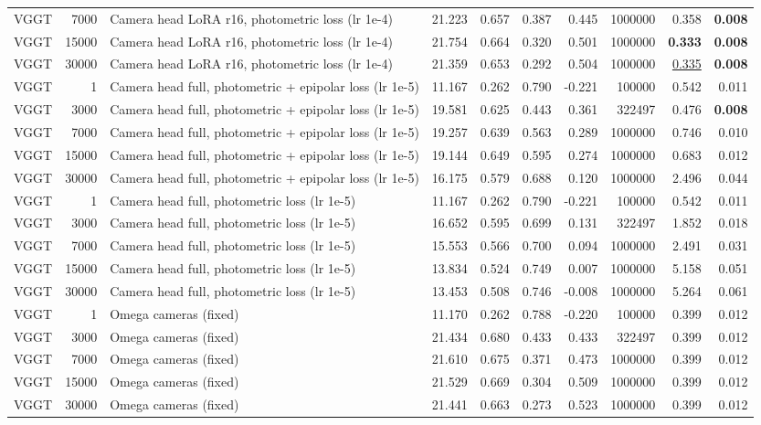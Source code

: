 \begin{table}[H]
\begin{tabular}{lrlrrrrrrr}
VGGT & 7000 & Camera head LoRA r16, photometric loss (lr 1e-4) & 21.223 & 0.657 & 0.387 & 0.445 & 1000000 & 0.358 & \textbf{0.008} \\
VGGT & 15000 & Camera head LoRA r16, photometric loss (lr 1e-4) & 21.754 & 0.664 & 0.320 & 0.501 & 1000000 & \textbf{0.333} & \textbf{0.008} \\
VGGT & 30000 & Camera head LoRA r16, photometric loss (lr 1e-4) & 21.359 & 0.653 & 0.292 & 0.504 & 1000000 & \underline{0.335} & \textbf{0.008} \\
VGGT & 1 & Camera head full, photometric + epipolar loss (lr 1e-5) & 11.167 & 0.262 & 0.790 & -0.221 & 100000 & 0.542 & 0.011 \\
VGGT & 3000 & Camera head full, photometric + epipolar loss (lr 1e-5) & 19.581 & 0.625 & 0.443 & 0.361 & 322497 & 0.476 & \textbf{0.008} \\
VGGT & 7000 & Camera head full, photometric + epipolar loss (lr 1e-5) & 19.257 & 0.639 & 0.563 & 0.289 & 1000000 & 0.746 & 0.010 \\
VGGT & 15000 & Camera head full, photometric + epipolar loss (lr 1e-5) & 19.144 & 0.649 & 0.595 & 0.274 & 1000000 & 0.683 & 0.012 \\
VGGT & 30000 & Camera head full, photometric + epipolar loss (lr 1e-5) & 16.175 & 0.579 & 0.688 & 0.120 & 1000000 & 2.496 & 0.044 \\
VGGT & 1 & Camera head full, photometric loss (lr 1e-5) & 11.167 & 0.262 & 0.790 & -0.221 & 100000 & 0.542 & 0.011 \\
VGGT & 3000 & Camera head full, photometric loss (lr 1e-5) & 16.652 & 0.595 & 0.699 & 0.131 & 322497 & 1.852 & 0.018 \\
VGGT & 7000 & Camera head full, photometric loss (lr 1e-5) & 15.553 & 0.566 & 0.700 & 0.094 & 1000000 & 2.491 & 0.031 \\
VGGT & 15000 & Camera head full, photometric loss (lr 1e-5) & 13.834 & 0.524 & 0.749 & 0.007 & 1000000 & 5.158 & 0.051 \\
VGGT & 30000 & Camera head full, photometric loss (lr 1e-5) & 13.453 & 0.508 & 0.746 & -0.008 & 1000000 & 5.264 & 0.061 \\
VGGT & 1 & Omega cameras (fixed) & 11.170 & 0.262 & 0.788 & -0.220 & 100000 & 0.399 & 0.012 \\
VGGT & 3000 & Omega cameras (fixed) & 21.434 & 0.680 & 0.433 & 0.433 & 322497 & 0.399 & 0.012 \\
VGGT & 7000 & Omega cameras (fixed) & 21.610 & 0.675 & 0.371 & 0.473 & 1000000 & 0.399 & 0.012 \\
VGGT & 15000 & Omega cameras (fixed) & 21.529 & 0.669 & 0.304 & 0.509 & 1000000 & 0.399 & 0.012 \\
VGGT & 30000 & Omega cameras (fixed) & 21.441 & 0.663 & 0.273 & 0.523 & 1000000 & 0.399 & 0.012 \\
\bottomrule
\end{tabular}
\end{table}